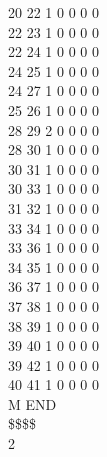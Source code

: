 \documentclass[11pt,titlepage,dvipdfmx,twoside]{jarticle}
\begin{document}
\begin{oframed}
{ 20 22  1  0  0  0  0                                                   \\
 22 23  1  0  0  0  0                                                   \\
 22 24  1  0  0  0  0                                                   \\
 24 25  1  0  0  0  0                                                   \\
 24 27  1  0  0  0  0                                                   \\
 25 26  1  0  0  0  0                                                   \\
 28 29  2  0  0  0  0                                                   \\
 28 30  1  0  0  0  0                                                   \\
 30 31  1  0  0  0  0                                                   \\
 30 33  1  0  0  0  0                                                   \\
 31 32  1  0  0  0  0                                                   \\
 33 34  1  0  0  0  0                                                   \\
 33 36  1  0  0  0  0                                                   \\
 34 35  1  0  0  0  0                                                   \\
 36 37  1  0  0  0  0                                                   \\
 37 38  1  0  0  0  0                                                   \\
 38 39  1  0  0  0  0                                                   \\
 39 40  1  0  0  0  0                                                   \\
 39 42  1  0  0  0  0                                                   \\
 40 41  1  0  0  0  0                                                   \\
M  END                                                                  \\
\$\$\$\$                                                                \\
2                                                                       \\
}
\end{oframed}
\end{document}
